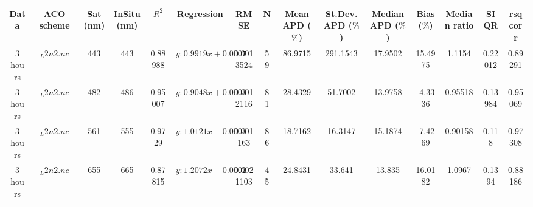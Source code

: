 \begin{tabular}{ccccccccccccccc} 
 \hline 
Data& ACO scheme & Sat (nm) & InSitu (nm) & $R^2$ & Regression & RMSE & N & Mean APD ($\%$) & St.Dev. APD ($\%$) & Median APD ($\%$) & Bias ($\%$) & Median ratio & SIQR & rsqcorr \\ \hline 
3 hours & $_L2n2.nc$ & 443 & 443 & 0.88988 & $y: 0.9919 x + 0.0007$ & 0.0013524 & 59 & 86.9715 & 291.1543 & 17.9502 & 15.4975 & 1.1154 & 0.22012 & 0.89291\\ 
3 hours & $_L2n2.nc$ & 482 & 486 & 0.95007 & $y: 0.9048 x + 0.0003$ & 0.0012116 & 81 & 28.4329 & 51.7002 & 13.9758 & -4.3336 & 0.95518 & 0.13984 & 0.95069\\ 
3 hours & $_L2n2.nc$ & 561 & 555 & 0.9729 & $y: 1.0121 x - 0.0005$ & 0.001163 & 86 & 18.7162 & 16.3147 & 15.1874 & -7.4269 & 0.90158 & 0.118 & 0.97308\\ 
3 hours & $_L2n2.nc$ & 655 & 665 & 0.87815 & $y: 1.2072 x - 0.0002$ & 0.0021103 & 45 & 24.8431 & 33.641 & 13.835 & 16.0182 & 1.0967 & 0.1394 & 0.88186\\ 
\hline 

 \end{tabular} 
